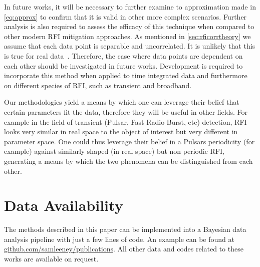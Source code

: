 \documentclass[fleqn,usenatbib]{mnras}
\begin{document}
In future works, it will be necessary to further examine to approximation made in \cref{eq:approx} to confirm that it is valid in other more complex scenarios. Further analysis is also required to assess the efficacy of this technique when compared to other modern RFI mitigation approaches. As mentioned in \cref{sec:rficorrtheory} we assume that each data point is separable and uncorrelated. It is unlikely that this is true for real data~\cite{wilensky2021improving}. Therefore, the case where data points are dependent on each other should be investigated in future works. Development is required to incorporate this method when applied to time integrated data and furthermore on different species of RFI, such as transient and broadband.

Our methodologies yield a means by which one can leverage their belief that certain parameters fit the data, therefore they will be useful in other fields. For example in the field of transient (Pulsar, Fast Radio Burst, etc) detection, RFI looks very similar in real space to the object of interest but very different in parameter space. One could thus leverage their belief in a Pulsars periodicity (for example) against similarly shaped (in real space) but non periodic RFI, generating a means by which the two phenomena can be distinguished from each other.

\section{Data Availability}
The methods described in this paper can be implemented into a Bayesian data analysis pipeline with just a few lines of code. An example can be found at \href{https://github.com/samleeney/Publications}{github.com/samleeney/publications}. All other data and codes related to these works are available on request.


\bsp	%
\label{lastpage}
\end{document}
